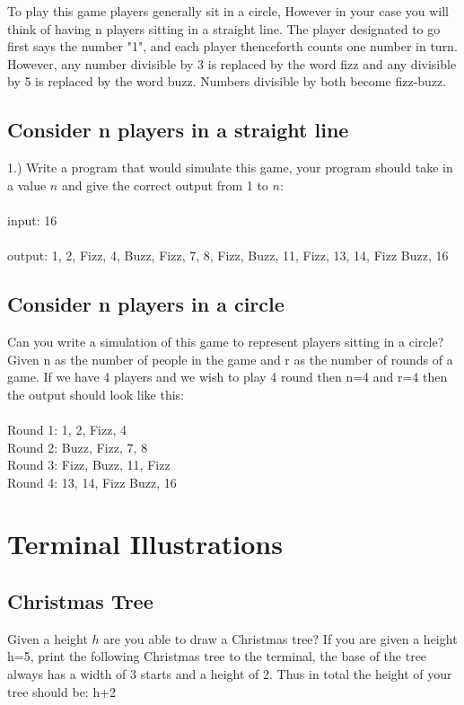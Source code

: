 \documentclass{article}
\begin{document}
To play this game players generally sit in a circle, However in your case you will think of having n players sitting in a straight line. The player designated to go first says the number "1", and each player thenceforth counts one number in turn. However, any number divisible by 3 is replaced by the word fizz and any divisible by 5 is replaced by the word buzz. Numbers divisible by both become fizz-buzz.
\subsection{Consider n players in a straight line}
1.) Write a program that would simulate this game, your program should take in a value $n$ and give the correct output from 1 to $n$:
\\\\
input: 16
\\\\
output: 1, 2, Fizz, 4, Buzz, Fizz, 7, 8, Fizz, Buzz, 11, Fizz, 13, 14, Fizz Buzz, 16
\subsection{Consider n players in a circle}
 Can you write a simulation of this game to represent players sitting in a circle? Given n as the number of people in the game and r as the number of rounds of a game. If we have 4 players and we wish to play 4 round then n=4 and r=4 then the output should look like this:
\\\\
Round 1: 1, 2, Fizz, 4\\
Round 2: Buzz, Fizz, 7, 8\\
Round 3: Fizz, Buzz, 11, Fizz\\
Round 4: 13, 14, Fizz Buzz, 16\\



\section{Terminal Illustrations}
\subsection{Christmas Tree}
Given a height $h$ are you able to draw a Christmas tree? If you are given a height h=5, print the following Christmas tree to the terminal, the base of the tree always has a width of 3 starts and a height of 2. Thus in total the height of your tree should be: h+2
\end{document}
